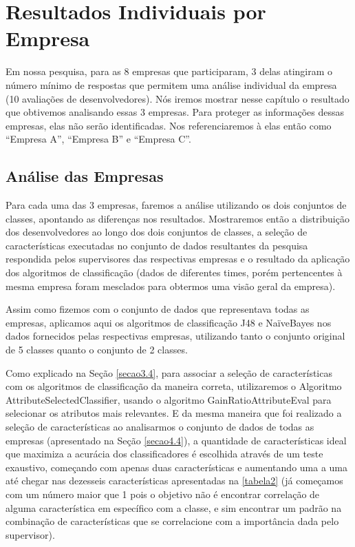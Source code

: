 \chapter[Resultados Individuais por Empresa]{Resultados Individuais por Empresa}

Em nossa pesquisa, para as 8 empresas que participaram, 3 delas atingiram o número mínimo de respostas que permitem uma análise individual da empresa (10 avaliações de desenvolvedores). Nós iremos mostrar nesse capítulo o resultado que obtivemos analisando essas 3 empresas. Para proteger as informações dessas empresas, elas não serão identificadas. Nos referenciaremos à elas então como “Empresa A”, “Empresa B” e “Empresa C”.

\section{Análise das Empresas}

Para cada uma das 3 empresas, faremos a análise utilizando os dois conjuntos de classes, apontando as diferenças nos resultados. Mostraremos então a distribuição dos desenvolvedores ao longo dos dois conjuntos de classes, a seleção de características executadas no conjunto de dados resultantes da pesquisa respondida pelos supervisores das respectivas empresas e o resultado da aplicação dos algoritmos de classificação (dados de diferentes times, porém pertencentes à mesma empresa foram mesclados para obtermos uma visão geral da empresa).

Assim como fizemos com o conjunto de dados que representava todas as empresas, aplicamos aqui os algoritmos de classificação J48 e NaïveBayes nos dados fornecidos pelas respectivas empresas, utilizando tanto o conjunto original de 5 classes quanto o conjunto de 2 classes. 

Como explicado na Seção \ref{secao3.4}, para associar a seleção de características com os algoritmos de classificação da maneira correta, utilizaremos o Algoritmo AttributeSelectedClassifier, usando o algoritmo GainRatioAttributeEval para selecionar os atributos mais relevantes. E da mesma maneira que foi realizado a seleção de características ao analisarmos o conjunto de dados de todas as empresas (apresentado na Seção \ref{secao4.4}), a quantidade de características ideal que maximiza a acurácia dos classificadores é escolhida através de um teste exaustivo, começando com apenas duas características e aumentando uma a uma até chegar nas dezesseis características apresentadas na \autoref{tabela2} (já começamos com um número maior que 1 pois o objetivo não é encontrar correlação de alguma característica em específico com a classe, e sim encontrar um padrão na combinação de características que se correlacione com a importância dada pelo supervisor).

